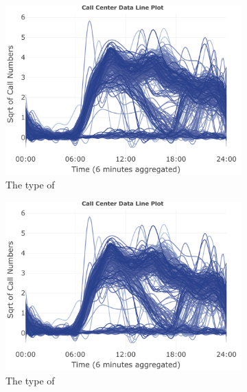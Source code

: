 \begin{figure}[ht!]
	\centering
	\begin{subfigure}[b]{0.4\textwidth}
		\includegraphics[page=1,width=\textwidth]{figures/call.pdf}
		\caption{The type of  }
	\end{subfigure}
\hspace{.5in}	
	\begin{subfigure}[b]{0.4\textwidth}
		\includegraphics[page=2,width=\textwidth]{figures/call.pdf}
		\caption{The type of }
	\end{subfigure}	
	\begin{subfigure}[b]{0.49\textwidth}
\vspace{.2in}	

\end{subfigure}
\end{figure}
